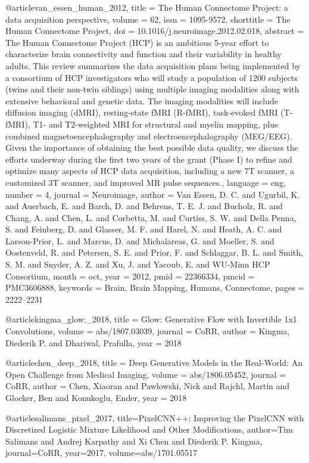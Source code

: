 \documentclass{article}
\begin{document}
@article{van_essen_human_2012,
	title = {The {Human} {Connectome} {Project}: a data acquisition perspective},
	volume = {62},
	issn = {1095-9572},
	shorttitle = {The {Human} {Connectome} {Project}},
	doi = {10.1016/j.neuroimage.2012.02.018},
	abstract = {The Human Connectome Project (HCP) is an ambitious 5-year effort to characterize brain connectivity and function and their variability in healthy adults. This review summarizes the data acquisition plans being implemented by a consortium of HCP investigators who will study a population of 1200 subjects (twins and their non-twin siblings) using multiple imaging modalities along with extensive behavioral and genetic data. The imaging modalities will include diffusion imaging (dMRI), resting-state fMRI (R-fMRI), task-evoked fMRI (T-fMRI), T1- and T2-weighted MRI for structural and myelin mapping, plus combined magnetoencephalography and electroencephalography (MEG/EEG). Given the importance of obtaining the best possible data quality, we discuss the efforts underway during the first two years of the grant (Phase I) to refine and optimize many aspects of HCP data acquisition, including a new 7T scanner, a customized 3T scanner, and improved MR pulse sequences.},
	language = {eng},
	number = {4},
	journal = {Neuroimage},
	author = {Van Essen, D. C. and Ugurbil, K. and Auerbach, E. and Barch, D. and Behrens, T. E. J. and Bucholz, R. and Chang, A. and Chen, L. and Corbetta, M. and Curtiss, S. W. and Della Penna, S. and Feinberg, D. and Glasser, M. F. and Harel, N. and Heath, A. C. and Larson-Prior, L. and Marcus, D. and Michalareas, G. and Moeller, S. and Oostenveld, R. and Petersen, S. E. and Prior, F. and Schlaggar, B. L. and Smith, S. M. and Snyder, A. Z. and Xu, J. and Yacoub, E. and {WU-Minn HCP Consortium}},
	month = oct,
	year = {2012},
	pmid = {22366334},
	pmcid = {PMC3606888},
	keywords = {Brain, Brain Mapping, Humans, Connectome},
	pages = {2222--2231}
}

@article{kingma_glow:_2018,
	title = {Glow: {Generative} {Flow} with {Invertible} 1x1 {Convolutions}},
	volume = {abs/1807.03039},
	journal = {CoRR},
	author = {Kingma, Diederik P. and Dhariwal, Prafulla},
	year = {2018}
}

@article{chen_deep_2018,
	title = {Deep {Generative} {Models} in the {Real}-{World}: {An} {Open} {Challenge} from {Medical} {Imaging}},
	volume = {abs/1806.05452},
	journal = {CoRR},
	author = {Chen, Xiaoran and Pawlowski, Nick and Rajchl, Martin and Glocker, Ben and Konukoglu, Ender},
	year = {2018}
}

@article{salimans_pixel_2017,
  title={PixelCNN++: Improving the PixelCNN with Discretized Logistic Mixture Likelihood and Other Modifications},
  author={Tim Salimans and Andrej Karpathy and Xi Chen and Diederik P. Kingma},
  journal={CoRR},
  year={2017},
  volume={abs/1701.05517}
}
\end{document}
